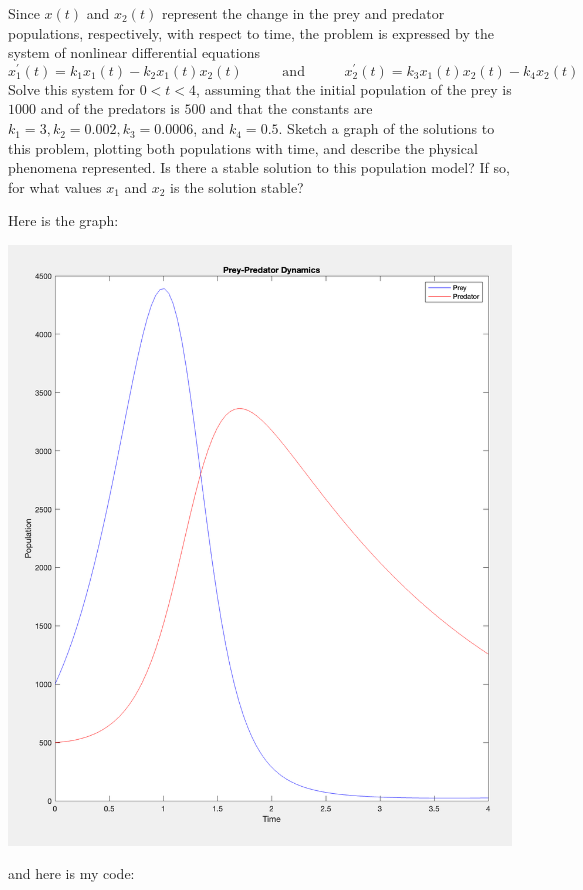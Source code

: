 \documentclass{article}
\begin{document}
Since $x(t)$ and $x_{2}(t)$ represent the change in the prey and predator populations, respectively, with respect to time, the problem is expressed by the system of nonlinear differential equations
    \begin{equation*}
        x^{\prime}_{1}(t) = k_{1}x_{1}(t) - k_{2}x_{1}(t)x_{2}(t) \hspace{30pt}  \text{ and } \hspace{30pt}  x_{2}^{\prime}(t) = k_{3}x_{1}(t)x_{2}(t) - k_{4}x_{2}(t)
    \end{equation*}
    Solve this system for $0 < t < 4$, assuming that the initial population of the prey is $1000$ and of the predators is $500$ and that the constants are $k_{1} = 3, k_{2} = 0.002, k_{3} = 0.0006$, and $k_{4} = 0.5$. Sketch a graph of the solutions to this problem, plotting both populations with time, and describe the physical phenomena represented. Is there a stable solution to this population model? If so, for what values $x_{1}$ and $x_{2}$ is the solution stable?
    \begin{answer}
        Here is the graph:
            \begin{center}
                \includegraphics[scale=0.5]{q3}
            \end{center}
        and here is my code:
        \inputminted{matlab}{./code/RKsystem.m}
        \inputminted{matlab}{./code/q3f1.m}
        \inputminted{matlab}{./code/q3f2.m}
        \inputminted{matlab}{./code/script3.m}
    \end{answer}
\end{document}
